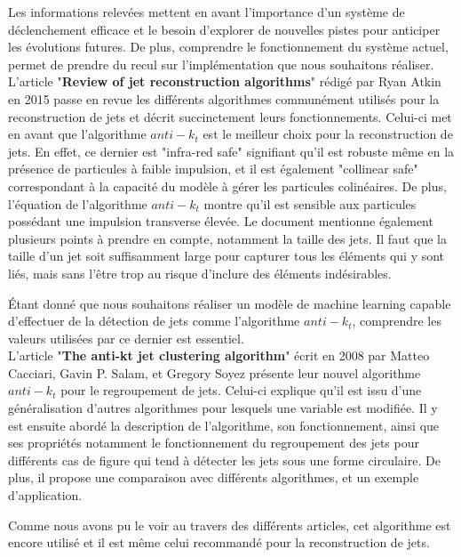 Les informations relevées mettent en avant l'importance d'un système de déclenchement efficace et le besoin d'explorer de nouvelles pistes pour anticiper les évolutions futures. De plus, comprendre le fonctionnement du système actuel, permet de prendre du recul sur l'implémentation que nous souhaitons réaliser.\\

L'article "\textbf{Review of jet reconstruction algorithms}" \cite{atkin_review_2015} rédigé par Ryan Atkin en 2015 passe en revue les différents algorithmes communément utilisés pour la reconstruction de jets et décrit succinctement leurs fonctionnements. Celui-ci met en avant que l'algorithme $anti-k_t$ est le meilleur choix pour la reconstruction de jets. En effet, ce dernier est "infra-red safe" signifiant qu'il est robuste même en la présence de particules à faible impulsion, et il est également "collinear safe" correspondant à la capacité du modèle à gérer les particules colinéaires. De plus, l'équation de l'algorithme $anti-k_t$ montre qu'il est sensible aux particules possédant une impulsion transverse élevée.
Le document mentionne également plusieurs points à prendre en compte, notamment la taille des jets. Il faut que la taille d'un jet soit suffisamment large pour capturer tous les éléments qui y sont liés, mais sans l'être trop au risque d'inclure des éléments indésirables.

Étant donné que nous souhaitons réaliser un modèle de machine learning capable d'effectuer de la détection de jets comme l'algorithme $anti-k_t$, comprendre les valeurs utilisées par ce dernier est essentiel.\\

L'article "\textbf{The anti-kt jet clustering algorithm}" \cite{cacciari_anti-k_t_2008} écrit en 2008 par Matteo Cacciari, Gavin P. Salam, et Gregory Soyez présente leur nouvel algorithme $anti-k_t$ pour le regroupement de jets. Celui-ci explique qu'il est issu d'une généralisation d'autres algorithmes pour lesquels une variable est modifiée. Il y est ensuite abordé la description de l'algorithme, son fonctionnement, ainsi que ses propriétés notamment le fonctionnement du regroupement des jets pour différents cas de figure qui tend à détecter les jets sous une forme circulaire. De plus, il propose une comparaison avec différents algorithmes, et un exemple d'application.

Comme nous avons pu le voir au travers des différents articles, cet algorithme est encore utilisé et il est même celui recommandé pour la reconstruction de jets.\\

